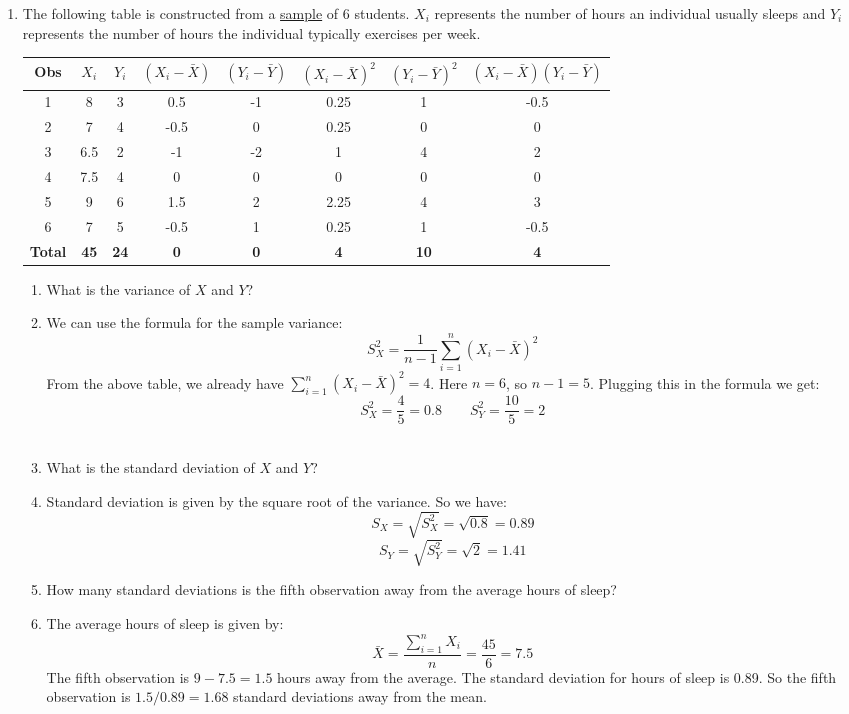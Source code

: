 \documentclass{./../../Latex/handout}
\begin{document}
\begin{enumerate}
\item The following table is constructed from a \underline{sample} of 6 students. $X_i$ represents the number of hours an individual usually sleeps and $Y_i$ represents the number of hours the individual typically exercises per week.  
\begin{center}
\footnotesize
\def\arraystretch{1.5}%
\begin{tabular}{|c|c|c|c|c|c|c|c|}
\hline
Obs & $X_i$ & $Y_i$ & $(X_i-\bar{X})$ & $(Y_i-\bar{Y})$ & $(X_i-\bar{X})^2$ & $(Y_i-\bar{Y})^2$ & $(X_i-\bar{X})(Y_i-\bar{Y})$  \\ \hline
1 & 8 & 3 & 0.5 & -1 & 0.25 & 1 & -0.5 \\ \hline
2 & 7 & 4 & -0.5 & 0 & 0.25 & 0 & 0 \\ \hline
3 & 6.5 & 2 & -1 & -2 & 1 & 4 & 2 \\ \hline
4 & 7.5 & 4 & 0 & 0 & 0 & 0 & 0 \\ \hline
5 & 9 & 6 & 1.5 & 2 & 2.25 & 4 & 3 \\ \hline
6 & 7 & 5 & -0.5 & 1 & 0.25 & 1 & -0.5 \\ \hline
\textbf{Total} & \textbf{45} & \textbf{24} & \textbf{0} & \textbf{0} & \textbf{4} & \textbf{10} & \textbf{4} \\ \hline
\end{tabular}
\end{center}
\begin{enumerate}
\item What is the variance of $X$ and $Y$? 
\item [] We can use the formula for the sample variance:
$$ S_X^2 = \frac{1}{n-1} \sum_{i=1}^n (X_i-\bar{X})^2 $$
From the above table, we already have $\sum_{i=1}^n (X_i-\bar{X})^2 = 4$. Here $n=6$, so $n-1=5$. Plugging this in the formula we get: 
$$ S_X^2 = \frac{4}{5} = 0.8 \quad \quad  S_Y^2 = \frac{10}{5} = 2 $$ \\
\item What is the standard deviation of $X$ and $Y$? 
\item [] Standard deviation is given by the square root of the variance. So we have: $$ S_X = \sqrt{S^2_X} = \sqrt{0.8} = 0.89 $$
 $$ S_Y = \sqrt{S^2_Y} = \sqrt{2} = 1.41 $$
\item How many standard deviations is the fifth observation away from the average hours of sleep? 
\item [] The average hours of sleep is given by:
 $$ \bar{X} = \frac{\sum_{i=1}^n X_i}{n} = \frac{45}{6} = 7.5 $$  The fifth observation is $9-7.5=1.5$ hours away from the average. The standard deviation for hours of sleep is 0.89. So the fifth observation is $1.5/0.89 = 1.68$ standard deviations away from the mean. \\

\end{enumerate}
\end{enumerate}
\end{document}
